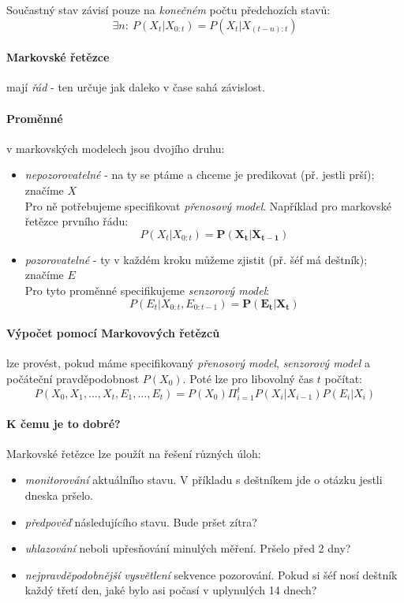 \documentclass[a4paper]{article}      %
\newenvironment{definition}[1][Definice]{\begin{trivlist}
\item[\hskip \labelsep {\bfseries #1}]}{\end{trivlist}}
\begin{document}
\begin{definition}[Markovův předpoklad]
Součastný stav závisí pouze na \emph{konečném} počtu předchozích stavů:
\[
\exists n:\ P(X_t | X_{0:t}) = P(X_t | X_{(t-n):t})
\]
\end{definition}

\paragraph{Markovské řetězce} mají \emph{řád} - ten určuje jak daleko v čase sahá závislost.

\paragraph{Proměnné} v markovských modelech jsou dvojího druhu:
\begin{itemize}
\item \emph{nepozorovatelné} - na ty se ptáme a chceme je predikovat (př. jestli prší); značíme $X$\\
Pro ně potřebujeme specifikovat \emph{přenosový model}. Například pro markovské řetězce prvního řádu:
\[
P(X_t | X_{0:t}) = \mathbf{P(X_t | X_{t-1})}
\]
\item \emph{pozorovatelné} - ty v každém kroku můžeme zjistit (př. šéf má deštník); značíme $E$\\
Pro tyto proměnné specifikujeme \emph{senzorový model}:
\[
P(E_t | X_{0:t}, E_{0:t-1}) = \mathbf{P(E_t | X_t)}
\] 
\end{itemize}

\paragraph{Výpočet pomocí Markovových řetězců} lze provést, pokud máme specifikovaný \emph{přenosový model}, \emph{senzorový model}
a počáteční pravděpodobnost $P(X_0)$. Poté lze pro libovolný čas $t$ počítat:
\[
P(X_0,X_1,\ldots,X_t,E_1,\ldots,E_t) = P(X_0)\Pi_{i=1}^{t} P(X_i|X_{i-1})P(E_i|X_i)
\]

\paragraph{K čemu je to dobré?} Markovské řetězce lze použít na řešení různých úloh:
\begin{itemize}
\item \emph{monitorování} aktuálního stavu. V příkladu s deštníkem jde o otázku jestli dneska pršelo.
\item \emph{předpověď} následujícího stavu. Bude pršet zítra?
\item \emph{uhlazování} neboli upřesňování minulých měření. Pršelo před 2 dny?
\item \emph{nejpravděpodobnější vysvětlení} sekvence pozorování.
Pokud si šéf nosí deštník každý třetí den, jaké bylo asi počasí v uplynulých 14 dnech?  
\end{itemize}
\end{document}
